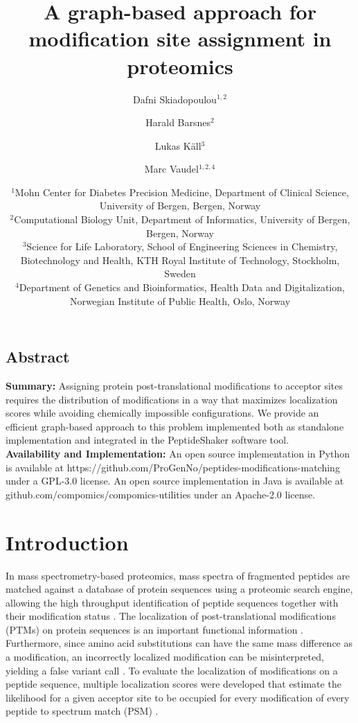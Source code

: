 \documentclass[]{article}
\title{A graph-based approach for modification site assignment in proteomics}
\author{Dafni Skiadopoulou$^{1,2}$ \and Harald Barsnes$^{2}$ \and Lukas Käll$^{3}$ \and Marc Vaudel$^{1,2,4}$}
\date{%
	$^1$Mohn Center for Diabetes Precision Medicine,
	Department of Clinical Science,
	University of Bergen, Bergen, Norway\\%
	$^2$Computational Biology Unit,
	Department of Informatics,
	University of Bergen, Bergen, Norway\\%
	$^3$Science for Life Laboratory,
	School of Engineering Sciences in Chemistry, Biotechnology and Health,
	KTH Royal Institute of Technology, Stockholm, Sweden\\
	$^4$Department of Genetics and Bioinformatics, Health Data and Digitalization,
	Norwegian Institute of Public Health, Oslo, Norway\\
}
\begin{document}
	
\maketitle


\subsection*{Abstract} 

\textbf{Summary:} 
	Assigning protein post-translational modifications to acceptor sites requires the distribution of modifications in a way that maximizes localization scores while avoiding chemically impossible configurations. We provide an efficient graph-based approach to this problem implemented both as standalone implementation and integrated in the PeptideShaker software tool. \\
\textbf{Availability and Implementation:} 
	An open source implementation in Python is available at https://github.com/ProGenNo/peptides-modifications-matching under a GPL-3.0 license. An open source implementation in Java is available at github.com/compomics/compomics-utilities under an Apache-2.0 license. \\

\maketitle

\section{Introduction}

In mass spectrometry-based proteomics, mass spectra of fragmented peptides are matched against a database of protein sequences using a proteomic search engine, allowing the high throughput identification of peptide sequences together with their modification status \cite{Mass_spec_proteomics}. The localization of post-translational modifications (PTMs) on protein sequences is an important functional information \cite{Phosphoproteomics}. Furthermore, since amino acid substitutions can have the same mass difference as a modification, an incorrectly localized modification can be misinterpreted, yielding a false variant call \cite{SNPs_PTMs_same_mass}. To evaluate the localization of modifications on a peptide sequence, multiple localization scores were developed that estimate the likelihood for a given acceptor site to be occupied for every modification of every peptide to spectrum match (PSM) \cite{Localization_scoring, computational_phosphoproteomics}.
\end{document}
